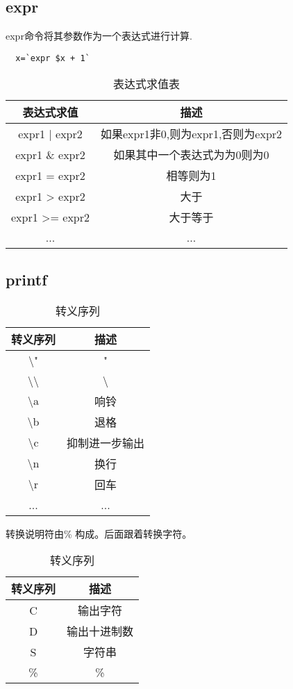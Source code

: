 \documentclass[a4paper]{ctexart}
\begin{document}
\subsection{expr}
expr命令将其参数作为一个表达式进行计算.
\begin{lstlisting}
  x=`expr $x + 1`
\end{lstlisting}

\begin{table}[p!]
  
  \caption{表达式求值表}
  \centering
  \begin{tabular}{|c|c|}
  \hline
  表达式求值 & 描述 \\
  \hline
  expr1 | expr2  & 如果expr1非0,则为expr1,否则为expr2 \\
  \hline
  expr1 \& expr2 & 如果其中一个表达式为为0则为0 \\
  \hline
  expr1 = expr2 & 相等则为1 \\
  \hline
  expr1 > expr2 & 大于 \\
  \hline
  expr1 >= expr2 & 大于等于 \\
  \hline
  ... & ... \\
  \hline
  \end{tabular}
\end{table}

\subsection{printf}
\begin{table}[p!]
  
  \caption{转义序列}
  \centering
  \begin{tabular}{|c|c|}
  \hline
  转义序列 & 描述 \\
  \hline
  \textbackslash"  & " \\
  \hline
  \textbackslash \textbackslash & \textbackslash \\
  \hline
  \textbackslash a & 响铃 \\ 
  \hline
  \textbackslash b & 退格 \\
  \hline
  \textbackslash c & 抑制进一步输出 \\
  \hline
  \textbackslash n & 换行 \\
  \hline
  \textbackslash r & 回车 \\
  \hline
  ... & ... \\
  \hline
  \end{tabular}
\end{table}

转换说明符由\% 构成。后面跟着转换字符。
\begin{table}[p!]
  
  \caption{转义序列}
  \centering
  \begin{tabular}{|c|c|}
  \hline
  转义序列 & 描述 \\
  \hline
  C  & 输出字符 \\
  \hline
  D & 输出十进制数 \\
  \hline
  S  & 字符串 \\ 
  \hline
  \% & \% \\
  \hline
  \end{tabular}
\end{table}
\end{document}
